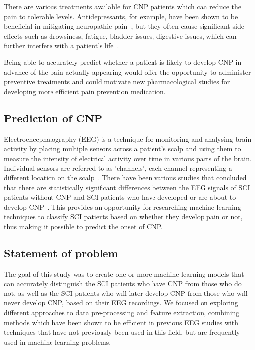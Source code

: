 \documentclass{mpaper}
\begin{document}
There are various treatments available for CNP patients which can reduce the pain to tolerable levels. Antidepressants, for example, have been shown to be beneficial in mitigating neuropathic pain~\cite{finnerup_review_2008}, but they often cause significant side effects such as drowsiness, fatigue, bladder issues, digestive issues, which can further interfere with a patient's life~\cite{finnerup_review_2008,khawam_side_2006}.

Being able to accurately predict whether a patient is likely to develop CNP in advance of the pain actually appearing would offer the opportunity to administer preventive treatments and could motivate new pharmacological studies for developing more efficient pain prevention medication.

\subsection{Prediction of CNP}

Electroencephalography (EEG) is a technique for monitoring and analysing brain activity by placing multiple sensors across a patient's scalp and using them to measure the intensity of electrical activity over time in various parts of the brain. Individual sensors are referred to as 'channels', each channel representing a different location on the scalp~\cite{noauthor_multi-channel_nodate}. There have been various studies that concluded that there are statistically significant differences between the EEG signals of SCI patients without CNP and SCI patients who have developed or are about to develop CNP~\cite{vuckovic_prediction_2018}. This provides an opportunity for researching machine learning techniques to classify SCI patients based on whether they develop pain or not, thus making it possible to predict the onset of CNP.

\subsection{Statement of problem}

The goal of this study was to create one or more machine learning models that can accurately distinguish the SCI patients who have CNP from those who do not, as well as the SCI patients who will later develop CNP from those who will never develop CNP, based on their EEG recordings. We focused on exploring different approaches to data pre-processing and feature extraction, combining methods which have been shown to be efficient in previous EEG studies with techniques that have not previously been used in this field, but are frequently used in machine learning problems.
\end{document}
